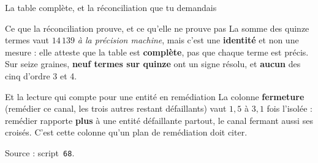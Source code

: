 \documentclass[11pt]{beamer}
\begin{document}
\begin{frame}{La table complète, et la réconciliation que tu demandais}
\begin{block}{Ce que la réconciliation prouve, et ce qu'elle ne prouve pas}
La somme des quinze termes vaut $14\,139$ \emph{à la précision machine}, mais c'est une
\textbf{identité} et non une mesure : elle atteste que la table est \textbf{complète}, pas que
chaque terme est précis. Sur seize graines, \textbf{neuf termes sur quinze} ont un signe résolu, et
\textbf{aucun} des cinq d'ordre 3 et 4.
\end{block}
\vspace{-1mm}
\begin{block}{Et la lecture qui compte pour une entité en remédiation}
La colonne \textbf{fermeture} (remédier ce canal, les trois autres restant défaillants) vaut
$1{,}5$ à $3{,}1$ fois l'isolée : remédier rapporte \textbf{plus} à une entité défaillante partout,
le canal fermant aussi ses croisés. C'est cette colonne qu'un plan de remédiation doit citer.
\end{block}
\vspace{-1mm}
{\scriptsize Source : script~\texttt{68}.}
\end{frame}
\end{document}
